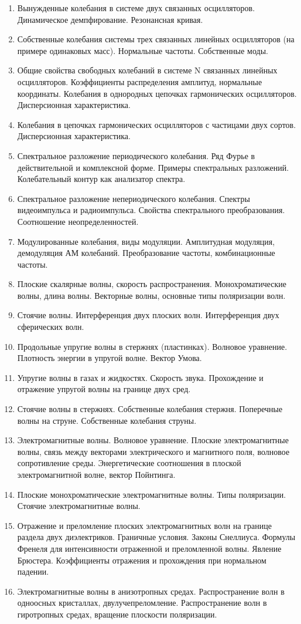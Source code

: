 \documentclass{article}
\newcounter{ticket}[subsection]
\newcounter{Ticket}[subsection]
\newcommand{\Ticket}[1][]{\item[Билет \ifthenelse{\equal{#1}{}}{}{\setcounter{ticket}{#1}}\theticket\refstepcounter{ticket}:]}
\begin{document}
\begin{enumerate}
    \Ticket Вынужденные колебания в системе двух связанных осцилляторов. Динамическое демпфирование. Резонансная кривая.
    \Ticket Собственные колебания системы трех связанных линейных осцилляторов (на примере одинаковых масс). Нормальные частоты. Собственные моды.
    \Ticket Общие свойства свободных колебаний в системе N связанных линейных осцилляторов. Коэффициенты распределения амплитуд, нормальные координаты. Колебания в однородных цепочках гармонических осцилляторов. Дисперсионная характеристика.
    \Ticket Колебания в цепочках гармонических осцилляторов с частицами двух сортов. Дисперсионная  характеристика.
    \Ticket Спектральное разложение периодического колебания. Ряд Фурье в действительной и комплексной форме. Примеры спектральных разложений. Колебательный контур как анализатор спектра.
    \Ticket Спектральное разложение непериодического колебания. Спектры видеоимпульса и радиоимпульса. Свойства спектрального преобразования. Соотношение неопределенностей.
    \Ticket Модулированные колебания, виды модуляции. Амплитудная модуляция, демодуляция АМ колебаний. Преобразование частоты, комбинационные частоты.
    \Ticket Плоские скалярные волны, скорость распространения. Монохроматические волны, длина волны. Векторные волны, основные типы поляризации волн.
    \Ticket Стоячие волны. Интерференция двух плоских волн. Интерференция двух сферических волн.
    \Ticket Продольные упругие волны в стержнях (пластинках). Волновое уравнение. Плотность энергии в упругой волне. Вектор Умова.
    \Ticket Упругие волны в газах и жидкостях. Скорость звука. Прохождение и отражение упругой волны на границе двух сред.
    \Ticket Стоячие волны в стержнях. Собственные колебания стержня. Поперечные волны на струне. Собственные колебания струны.
    \Ticket Электромагнитные волны. Волновое уравнение. Плоские электромагнитные волны, связь между векторами электрического и магнитного поля, волновое сопротивление среды. Энергетические соотношения в плоской электромагнитной волне, вектор Пойнтинга. 
    \Ticket Плоские монохроматические электромагнитные волны. Типы поляризации. Стоячие электромагнитные волны.
    \Ticket Отражение и преломление плоских электромагнитных волн на границе раздела двух диэлектриков. Граничные условия. Законы Снеллиуса. Формулы Френеля для интенсивности отраженной и преломленной волны. Явление Брюстера. Коэффициенты отражения и прохождения при нормальном падении.
    \Ticket Электромагнитные волны в анизотропных средах. Распространение волн в одноосных кристаллах, двулучепреломление. Распространение волн в гиротропных средах, вращение плоскости поляризации.

\end{enumerate}
\end{document}
